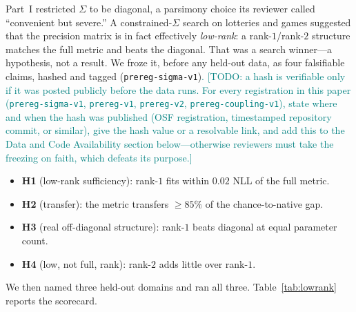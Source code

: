 \documentclass[journal]{IEEEtran}
\newcommand{\rev}[1]{\textcolor{teal}{#1}}
\begin{document}
Part~I restricted $\Sigma$ to be diagonal, a parsimony choice its reviewer called ``convenient but severe.''
A constrained-$\Sigma$ search on lotteries and games suggested that the precision matrix is in fact effectively \emph{low-rank}: a rank-$1$/rank-$2$ structure matches the full metric and beats the diagonal.
That was a search winner---a hypothesis, not a result.
We froze it, before any held-out data, as four falsifiable claims, hashed and tagged (\texttt{prereg-sigma-v1})\rev{. [TODO: a hash is verifiable only if it was posted publicly before the data runs. For every registration in this paper (\texttt{prereg-sigma-v1}, \texttt{prereg-v1}, \texttt{prereg-v2}, \texttt{prereg-coupling-v1}), state where and when the hash was published (OSF registration, timestamped repository commit, or similar), give the hash value or a resolvable link, and add this to the Data and Code Availability section below---otherwise reviewers must take the freezing on faith, which defeats its purpose.]}
\begin{itemize}
    \item \textbf{H1} (low-rank sufficiency): rank-$1$ fits within $0.02$ NLL of the full metric.
    \item \textbf{H2} (transfer): the metric transfers $\geq85\%$ of the chance-to-native gap.
    \item \textbf{H3} (real off-diagonal structure): rank-$1$ beats diagonal at equal parameter count.
    \item \textbf{H4} (low, not full, rank): rank-$2$ adds little over rank-$1$.
\end{itemize}
We then named three held-out domains and ran all three.
Table~\ref{tab:lowrank} reports the scorecard.
\end{document}
